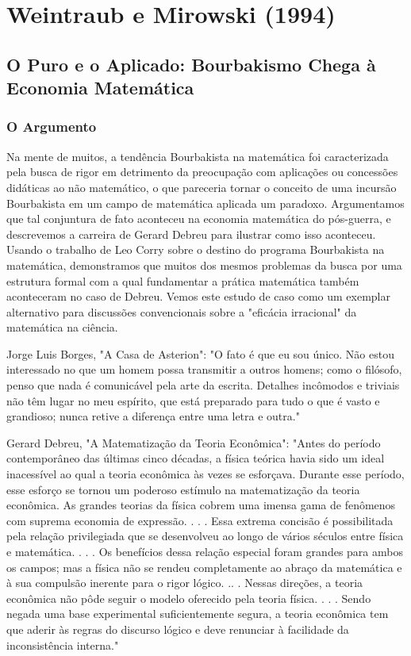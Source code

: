 \documentclass[12pt]{article}
\begin{document}
\section{\textbf{Weintraub e Mirowski (1994)}}
\subsection{\textbf{O Puro e o Aplicado: Bourbakismo Chega à Economia Matemática}}
\subsubsection{\textbf{O Argumento}}
Na mente de muitos, a tendência Bourbakista na matemática foi caracterizada pela busca de rigor em detrimento da preocupação com aplicações ou concessões didáticas ao não matemático, o que pareceria tornar o conceito de uma incursão Bourbakista em um campo de matemática aplicada um paradoxo. Argumentamos que tal conjuntura de fato aconteceu na economia matemática do pós-guerra, e descrevemos a carreira de Gerard Debreu para ilustrar como isso aconteceu. Usando o trabalho de Leo Corry sobre o destino do programa Bourbakista na matemática, demonstramos que muitos dos mesmos problemas da busca por uma estrutura formal com a qual fundamentar a prática matemática também aconteceram no caso de Debreu. Vemos este estudo de caso como um exemplar alternativo para discussões convencionais sobre a "eficácia irracional" da matemática na ciência.

Jorge Luis Borges, "A Casa de Asterion":
"O fato é que eu sou único. Não estou interessado no que um homem possa transmitir a outros homens; como o filósofo, penso que nada é comunicável pela arte da escrita. Detalhes incômodos e triviais não têm lugar no meu espírito, que está preparado para tudo o que é vasto e grandioso; nunca retive a diferença entre uma letra e outra."

Gerard Debreu, "A Matematização da Teoria Econômica":
"Antes do período contemporâneo das últimas cinco décadas, a física teórica havia sido um ideal inacessível ao qual a teoria econômica às vezes se esforçava. Durante esse período, esse esforço se tornou um poderoso estímulo na matematização da teoria econômica. As grandes teorias da física cobrem uma imensa gama de fenômenos com suprema economia de expressão. . . . Essa extrema concisão é possibilitada pela relação privilegiada que se desenvolveu ao longo de vários séculos entre física e matemática. . . . Os benefícios dessa relação especial foram grandes para ambos os campos; mas a física não se rendeu completamente ao abraço da matemática e à sua compulsão inerente para o rigor lógico. .. . Nessas direções, a teoria econômica não pôde seguir o modelo oferecido pela teoria física. . . . Sendo negada uma base experimental suficientemente segura, a teoria econômica tem que aderir às regras do discurso lógico e deve renunciar à facilidade da inconsistência interna."
\end{document}
